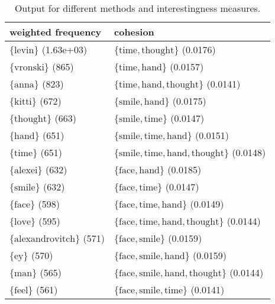 \begin{table}

\begin{tabulary}{\textwidth}{L|L}

weighted frequency & cohesion \\
\hline
$ \{ \text{levin} \} $ (1.63e+03) & $ \{ \text{time}, \text{thought} \} $ (0.0176) \\
$ \{ \text{vronski} \} $ (865) & $ \{ \text{time}, \text{hand} \} $ (0.0157) \\
$ \{ \text{anna} \} $ (823) & $ \{ \text{time}, \text{hand}, \text{thought} \} $ (0.0141) \\
$ \{ \text{kitti} \} $ (672) & $ \{ \text{smile}, \text{hand} \} $ (0.0175) \\
$ \{ \text{thought} \} $ (663) & $ \{ \text{smile}, \text{time} \} $ (0.0147) \\
$ \{ \text{hand} \} $ (651) & $ \{ \text{smile}, \text{time}, \text{hand} \} $ (0.0151) \\
$ \{ \text{time} \} $ (651) & $ \{ \text{smile}, \text{time}, \text{hand}, \text{thought} \} $ (0.0148) \\
$ \{ \text{alexei} \} $ (632) & $ \{ \text{face}, \text{hand} \} $ (0.0185) \\
$ \{ \text{smile} \} $ (632) & $ \{ \text{face}, \text{time} \} $ (0.0147) \\
$ \{ \text{face} \} $ (598) & $ \{ \text{face}, \text{time}, \text{hand} \} $ (0.0149) \\
$ \{ \text{love} \} $ (595) & $ \{ \text{face}, \text{time}, \text{hand}, \text{thought} \} $ (0.0144) \\
$ \{ \text{alexandrovitch} \} $ (571) & $ \{ \text{face}, \text{smile} \} $ (0.0159) \\
$ \{ \text{ey} \} $ (570) & $ \{ \text{face}, \text{smile}, \text{hand} \} $ (0.0159) \\
$ \{ \text{man} \} $ (565) & $ \{ \text{face}, \text{smile}, \text{hand}, \text{thought} \} $ (0.0144) \\
$ \{ \text{feel} \} $ (561) & $ \{ \text{face}, \text{smile}, \text{time} \} $ (0.0141) \\
\end{tabulary}

\caption{Output for different methods and interestingness measures.}
\end{table}
